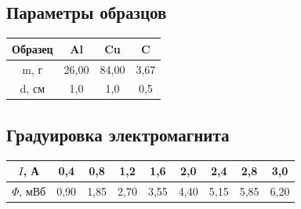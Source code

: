 \documentclass{article}
\begin{document}
	\subsection{Параметры образцов}
	
	\begin{table}[h!]
		\centering
		\begin{tabular}{|c|c|c|c|}
			\hline
			Образец & Al & Cu & C \\
			\hline
			m, г & 26,00 & 84,00 & 3,67 \\
			\hline
			d, см & 1,0 & 1,0 & 0,5 \\
			\hline
		\end{tabular}
	\end{table}

	\subsection{Градуировка электромагнита}
	
	\begin{table}[h!]
		\centering
		\begin{tabular}{|c|c|c|c|c|c|c|c|c|}
			\hline
			$I$, А & 0,4 & 0,8 & 1,2 & 1,6 & 2,0 & 2,4 & 2,8 & 3,0 \\
			\hline
			$\Phi$, мВб & 0,90 & 1,85 & 2,70 & 3,55 & 4,40 & 5,15 & 5,85 & 6,20 \\
			\hline
		\end{tabular}
	\end{table}
\end{document}

